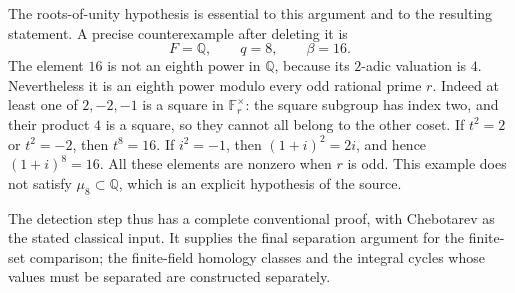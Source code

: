 The roots-of-unity hypothesis is essential to this argument
and to the resulting statement.  A precise counterexample
after deleting it is
\[
                      F=\mathbb Q,\qquad q=8,\qquad\beta=16.
\]
The element \(16\) is not an eighth power in \(\mathbb Q\),
because its \(2\)-adic valuation is \(4\).
Nevertheless it is an eighth power modulo every odd
rational prime \(r\).
Indeed at least one of \(2,-2,-1\) is a square in
\(\mathbb F_r^\times\): the square subgroup has index
two, and their product \(4\) is a square, so they cannot
all belong to the other coset.
If \(t^2=2\) or \(t^2=-2\), then \(t^8=16\).
If \(i^2=-1\), then \((1+i)^2=2i\), and hence
\((1+i)^8=16\).
All these elements are nonzero when \(r\) is odd.
This example does not satisfy \(\mu_8\subset\mathbb Q\),
which is an explicit hypothesis of the source.

The detection step thus has a complete conventional proof,
with Chebotarev as the stated classical input.
It supplies the final separation argument for the finite-set
comparison; the finite-field homology classes and the integral
cycles whose values must be separated are constructed separately.


